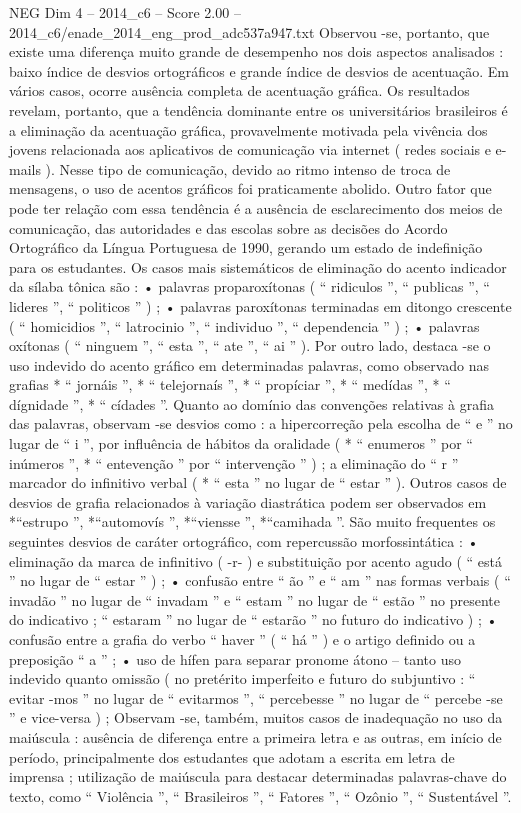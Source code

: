\begin{textsample}{NEG Dim 4 – 2014\_c6 – Score 2.00 – 2014\_c6/enade\_2014\_eng\_prod\_adc537a947.txt}
Observou -se, portanto, que existe uma diferença muito grande de desempenho nos dois aspectos analisados : baixo índice de desvios ortográficos e grande índice de desvios de acentuação.
Em vários casos, ocorre ausência completa de acentuação gráfica.
Os resultados revelam, portanto, que a tendência dominante entre os universitários brasileiros é a eliminação da acentuação gráfica, provavelmente motivada pela vivência dos jovens relacionada aos aplicativos de comunicação via internet ( redes sociais e e-mails ).
Nesse tipo de comunicação, devido ao ritmo intenso de troca de mensagens, o uso de acentos gráficos foi praticamente abolido.
Outro fator que pode ter relação com essa tendência é a ausência de esclarecimento dos meios de comunicação, das autoridades e das escolas sobre as decisões do Acordo Ortográfico da Língua Portuguesa de 1990, gerando um estado de indefinição para os estudantes.
Os casos mais sistemáticos de eliminação do acento indicador da sílaba tônica são : • palavras proparoxítonas ( “ ridiculos ”, “ publicas ”, “ lideres ”, “ politicos ” ) ; • palavras paroxítonas terminadas em ditongo crescente ( “ homicidios ”, “ latrocinio ”, “ individuo ”, “ dependencia ” ) ; • palavras oxítonas ( “ ninguem ”, “ esta ”, “ ate ”, “ ai ” ).
Por outro lado, destaca -se o uso indevido do acento gráfico em determinadas palavras, como observado nas grafias * “ jornáis ”, * “ telejornaís ”, * “ propíciar ”, * “ medídas ”, * “ dígnidade ”, * “ cídades ”.
Quanto ao domínio das convenções relativas à grafia das palavras, observam -se desvios como : a hipercorreção pela escolha de “ e ” no lugar de “ i ”, por influência de hábitos da oralidade ( * “ enumeros ” por “ inúmeros ”, * “ entevenção ” por “ intervenção ” ) ; a eliminação do “ r ” marcador do infinitivo verbal ( * “ esta ” no lugar de “ estar ” ).
Outros casos de desvios de grafia relacionados à variação diastrática podem ser observados em *“estrupo ”, *“automovís ”, *“viensse ”, *“camihada ”.
São muito frequentes os seguintes desvios de caráter ortográfico, com repercussão morfossintática : • eliminação da marca de infinitivo ( -r- ) e substituição por acento agudo ( “ está ” no lugar de “ estar ” ) ; • confusão entre “ ão ” e “ am ” nas formas verbais ( “ invadão ” no lugar de “ invadam ” e “ estam ” no lugar de “ estão ” no presente do indicativo ; “ estaram ” no lugar de “ estarão ” no futuro do indicativo ) ; • confusão entre a grafia do verbo “ haver ” ( “ há ” ) e o artigo definido ou a preposição “ a ” ; • uso de hífen para separar pronome átono – tanto uso indevido quanto omissão ( no pretérito imperfeito e futuro do subjuntivo : “ evitar -mos ” no lugar de “ evitarmos ”, “ percebesse ” no lugar de “ percebe -se ” e vice-versa ) ; Observam -se, também, muitos casos de inadequação no uso da maiúscula : ausência de diferença entre a primeira letra e as outras, em início de período, principalmente dos estudantes que adotam a escrita em letra de imprensa ; utilização de maiúscula para destacar determinadas palavras-chave do texto, como “ Violência ”, “ Brasileiros ”, “ Fatores ”, “ Ozônio ”, “ Sustentável ”.

\end{textsample}
